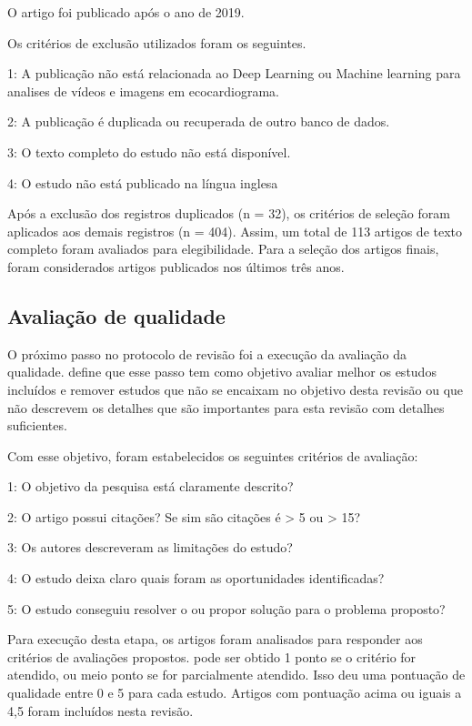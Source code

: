 O artigo foi publicado após o ano de 2019. 

Os critérios de exclusão utilizados foram os seguintes.

1: A publicação não está relacionada ao Deep Learning ou Machine learning para  analises de vídeos e imagens em ecocardiograma.

2: A publicação é duplicada ou recuperada de outro banco de dados.

3: O texto completo do estudo não está disponível.

4: O estudo não está publicado na língua inglesa


Após a exclusão dos registros duplicados (n = 32), os critérios de seleção foram aplicados aos demais registros (n = 404). Assim, um total de 113 artigos de texto completo foram avaliados para elegibilidade. Para a seleção dos artigos finais, foram considerados artigos publicados nos últimos três anos. 

\subsection {Avaliação de qualidade}
\label{Avaliação de qualidade}

O próximo passo no protocolo de revisão foi a execução da  avaliação da qualidade. \textcite{kitchenham2009systematic} define que esse passo tem como objetivo avaliar melhor os estudos incluídos e remover estudos que não se encaixam no objetivo desta revisão ou que não descrevem os detalhes que são importantes para esta revisão com detalhes suficientes. 

Com esse objetivo, foram estabelecidos os  seguintes critérios de avaliação:

1: O objetivo da pesquisa está claramente descrito?

2: O artigo possui citações? Se sim são citações é > 5 ou > 15?

3: Os autores descreveram as limitações do estudo?

4: O estudo deixa claro quais foram as oportunidades identificadas?

5: O estudo conseguiu resolver o ou propor solução para o problema proposto?

Para execução desta etapa, os artigos foram analisados para responder aos critérios de avaliações propostos. pode ser obtido 1 ponto se o critério for atendido, ou meio ponto se for parcialmente atendido. Isso deu uma pontuação de qualidade entre 0 e 5 para cada estudo. Artigos com pontuação acima ou iguais a 4,5 foram incluídos nesta revisão.

